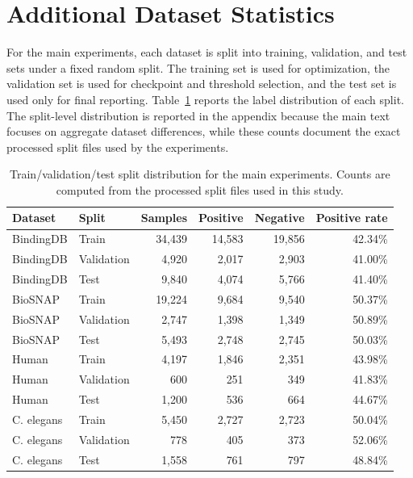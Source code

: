 \section{Additional Dataset Statistics}
\label{app:dataset_statistics}

For the main experiments, each dataset is split into training, validation, and test sets under a fixed random split. The training set is used for optimization, the validation set is used for checkpoint and threshold selection, and the test set is used only for final reporting. Table~\ref{tab:data_split_appendix} reports the label distribution of each split. The split-level distribution is reported in the appendix because the main text focuses on aggregate dataset differences, while these counts document the exact processed split files used by the experiments.

\begin{table}[!htbp]
\caption{Train/validation/test split distribution for the main experiments. Counts are computed from the processed split files used in this study.}
\label{tab:data_split_appendix}
\begin{center}
\scriptsize
\setlength{\tabcolsep}{4pt}
\begin{tabular}{llrrrr}
\toprule
Dataset & Split & Samples & Positive & Negative & Positive rate \\
\midrule
BindingDB & Train & 34,439 & 14,583 & 19,856 & 42.34\% \\
BindingDB & Validation & 4,920 & 2,017 & 2,903 & 41.00\% \\
BindingDB & Test & 9,840 & 4,074 & 5,766 & 41.40\% \\
BioSNAP & Train & 19,224 & 9,684 & 9,540 & 50.37\% \\
BioSNAP & Validation & 2,747 & 1,398 & 1,349 & 50.89\% \\
BioSNAP & Test & 5,493 & 2,748 & 2,745 & 50.03\% \\
Human & Train & 4,197 & 1,846 & 2,351 & 43.98\% \\
Human & Validation & 600 & 251 & 349 & 41.83\% \\
Human & Test & 1,200 & 536 & 664 & 44.67\% \\
C. elegans & Train & 5,450 & 2,727 & 2,723 & 50.04\% \\
C. elegans & Validation & 778 & 405 & 373 & 52.06\% \\
C. elegans & Test & 1,558 & 761 & 797 & 48.84\% \\
\bottomrule
\end{tabular}
\end{center}
\end{table}
